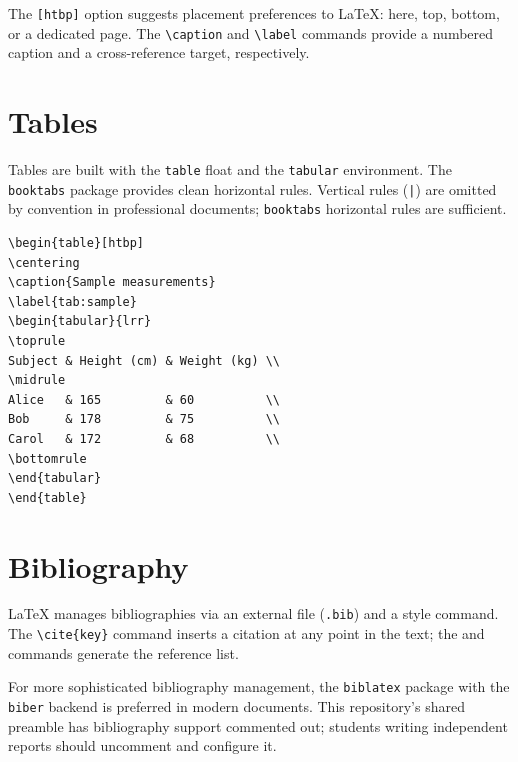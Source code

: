 The \texttt{[htbp]} option suggests placement preferences to
\LaTeX{}: here, top, bottom, or a dedicated page. The
\verb|\caption| and \verb|\label| commands provide a numbered caption
and a cross-reference target, respectively.

\section{Tables}
\label{sec:latex-tables}

Tables are built with the \texttt{table} float and the
\texttt{tabular} environment. The \texttt{booktabs} package 
provides clean horizontal rules.
Vertical rules (\texttt{|}) are omitted by convention in professional
documents; \texttt{booktabs} horizontal rules are sufficient.

\begin{lstlisting}[style=inlineStyle, caption={A minimal table with booktabs}]
\begin{table}[htbp]
\centering
\caption{Sample measurements}
\label{tab:sample}
\begin{tabular}{lrr}
\toprule
Subject & Height (cm) & Weight (kg) \\
\midrule
Alice   & 165         & 60          \\
Bob     & 178         & 75          \\
Carol   & 172         & 68          \\
\bottomrule
\end{tabular}
\end{table}
\end{lstlisting}

\section{Bibliography}
\label{sec:latex-bibliography}

\LaTeX{} manages bibliographies via an external file (\texttt{.bib})
and a style command. The \verb|\cite{key}| command inserts a citation
at any point in the text; the \verb|| and
\verb|| commands generate the reference list.

For more sophisticated bibliography management, the \texttt{biblatex}
package with the \texttt{biber} backend is preferred in modern
documents. This repository's shared preamble has bibliography support
commented out; students writing independent reports should uncomment
and configure it.


